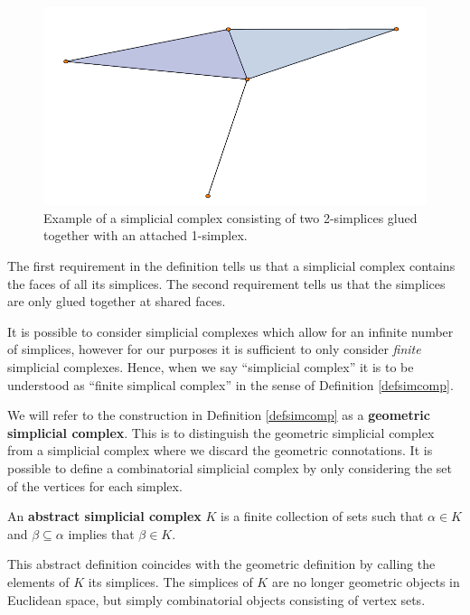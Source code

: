\begin{figure}
  \centering
  \includegraphics[scale=0.7]{complex.pdf}
  \caption{ \label{complex2} Example of a simplicial complex consisting of two 2-simplices glued together with an attached 1-simplex.}
\end{figure}

The first requirement in the definition tells us that a simplicial complex contains the faces of all its simplices. The second requirement tells us that the simplices are only glued together at shared faces.

It is possible to consider simplicial complexes which allow for an infinite number of simplices, however for our purposes it is sufficient to only consider \textit{finite} simplicial complexes. Hence, when we say ``simplicial complex'' it is to be understood as ``finite simplical complex'' in the sense of Definition \ref{defsimcomp}.


We will refer to the construction in Definition \ref{defsimcomp} as a \textbf{geometric simplicial complex}. This is to distinguish the geometric simplicial complex from a simplicial complex where we discard the geometric connotations. It is possible to define a combinatorial simplicial complex by only considering the set of the vertices for each simplex.

\begin{definition}  \label{defabstractsimcomp}
An \textbf{abstract simplicial complex} $K$ is a finite collection of sets such that $\alpha \in K$ and $\beta \subseteq \alpha$ implies that $\beta \in K$.
\end{definition}

This abstract definition coincides with the geometric definition by calling the elements of $K$ its simplices. The simplices of $K$ are no longer geometric objects in Euclidean space, but simply combinatorial objects consisting of vertex sets.

